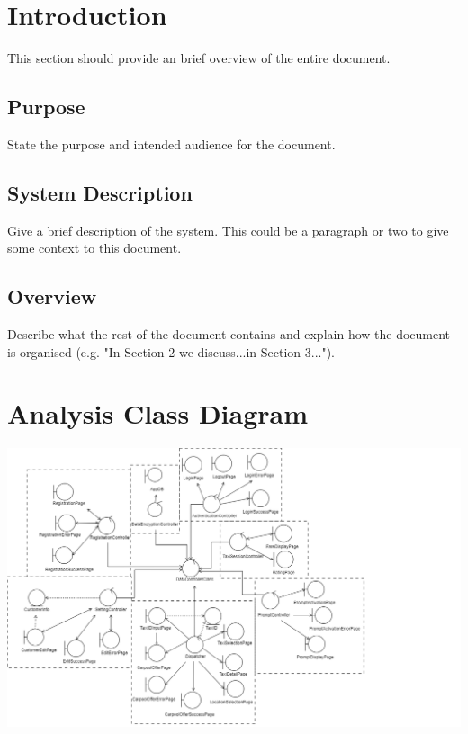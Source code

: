 \documentclass[]{article}
\begin{document}
\newpage
\section{Introduction}
\label{sec:introduction}

This section should provide an brief overview of the entire document.

\subsection{Purpose}
\label{sub:purpose}
State the purpose and intended audience for the document.

\subsection{System Description}
\label{sub:system_description}
Give a brief description of the system. This could be a paragraph or two to give some context to this document.


\subsection{Overview}
\label{sub:overview}
Describe what the rest of the document contains and explain how the document is organised (e.g. "In Section 2 we discuss...in Section 3...").



\section{Analysis Class Diagram}
\label{sec:analysis_class_diagram}
\includegraphics[scale = 0.5]{Graphics/ACD.png}
\end{document}
